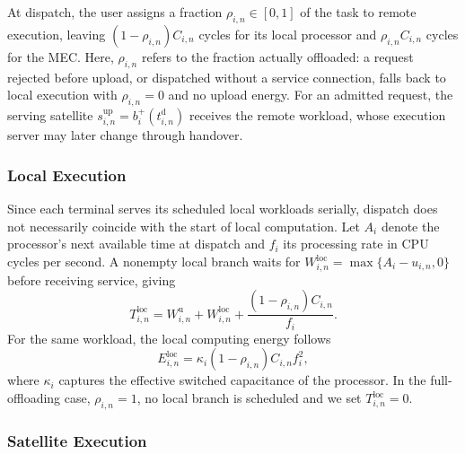\documentclass[journal]{IEEEtran}
\begin{document}
At dispatch, the user assigns a fraction
$\rho_{i,n}\in[0,1]$ of the task to remote execution,
leaving $(1-\rho_{i,n})C_{i,n}$ cycles for its local
processor and $\rho_{i,n}C_{i,n}$ cycles for the MEC.
Here, $\rho_{i,n}$ refers to the fraction actually
offloaded: a request rejected before upload, or dispatched
without a service connection, falls back to local execution
with $\rho_{i,n}=0$ and no upload energy. For an admitted
request, the serving satellite
$s_{i,n}^{\mathrm{up}}=b_i^{+}(t_{i,n}^{\mathrm d})$
receives the remote workload, whose execution server
may later change through handover.

\subsubsection{Local Execution}

Since each terminal serves its scheduled local workloads
serially, dispatch does not necessarily coincide with the
start of local computation. Let $A_i$ denote the processor's
next available time at dispatch and $f_i$ its processing
rate in CPU cycles per second. A nonempty local branch
waits for $W^{\mathrm{loc}}_{i,n}=\max\{A_i-u_{i,n},0\}$
before receiving service, giving
\begin{equation}
T^{\mathrm{loc}}_{i,n}=
W^{\mathrm u}_{i,n}
+W^{\mathrm{loc}}_{i,n}
+\frac{(1-\rho_{i,n})C_{i,n}}{f_i}.
\label{eq:local_delay}
\end{equation}
For the same workload, the local computing energy follows
\begin{equation}
E^{\mathrm{loc}}_{i,n}
=\kappa_i(1-\rho_{i,n})C_{i,n}f_i^2,
\label{eq:local_energy}
\end{equation}
where $\kappa_i$ captures the effective switched
capacitance of the processor. In the full-offloading
case, $\rho_{i,n}=1$, no local branch is scheduled and
we set $T^{\mathrm{loc}}_{i,n}=0$.

\subsubsection{Satellite Execution}
\end{document}
